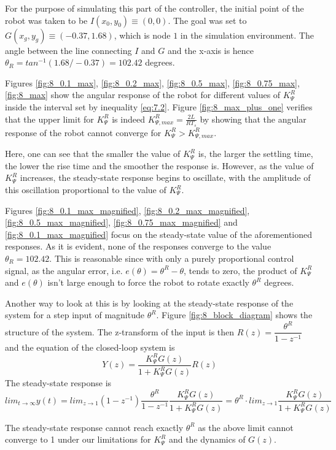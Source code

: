 For the purpose of simulating this part of the controller, the initial point of
the robot was taken to be $I (x_0, y_0) \equiv (0,0)$. The goal was set to
$G (x_g, y_g) \equiv (-0.37, 1.68)$, which is node $1$ in the simulation
environment. The angle between the line connecting $I$ and $G$ and the
x-axis is hence $\theta_R = tan^{-1}(1.68 / -0.37) = 102.42$ degrees.

Figures \ref{fig:8_0.1_max}, \ref{fig:8_0.2_max}, \ref{fig:8_0.5_max},
\ref{fig:8_0.75_max}, \ref{fig:8_max} show the angular response of the robot
for different values of $K_{\Psi}^R$ inside the interval set by inequality
\ref{eq:7.2}. Figure \ref{fig:8_max_plus_one} verifies that the upper limit
for $K_{\Psi}^R$ is indeed $K_{\Psi,max}^R = \frac{2L}{RT_s}$ by showing that the
angular response of the robot cannot converge for $K_{\Psi}^R > K_{\Psi,max}^R$.

Here, one can see that the smaller the value of $K_{\Psi}^R$ is, the larger the
settling time, the lower the rise time and the smoother the response is. However,
as the value of $K_{\Psi}^R$ increases, the steady-state response begins to
oscillate, with the amplitude of this oscillation proportional to the value of
$K_{\Psi}^R$.

Figures \ref{fig:8_0.1_max_magnified}, \ref{fig:8_0.2_max_magnified},
\ref{fig:8_0.5_max_magnified}, \ref{fig:8_0.75_max_magnified} and
\ref{fig:8_0.1_max_magnified} focus on the steady-state value of the
aforementioned responses. As it is evident, none of the responses converge to
the value $\theta_R = 102.42$. This is reasonable since with only a purely
proportional control signal, as the angular error, i.e. $e(\theta) = \theta^R - \theta$,
tends to zero, the product of $K_{\Psi}^R$ and $e(\theta)$ isn't large enough
to force the robot to rotate exactly $\theta^R$ degrees.

Another way to look at this is by looking at the steady-state response of the
system for a step input of magnitude $\theta^R$. Figure \ref{fig:8_block_diagram}
shows the structure of the system. The z-transform of the input
is then $R(z) = \dfrac{\theta^R}{1 - z^{-1}}$ and the equation of the closed-loop
system is
$$Y(z) = \dfrac{K_{\Psi}^R G(z)}{1 + K_{\Psi}^R G(z)} R(z)$$
The steady-state response is
$$lim_{t \to \infty} y(t) = lim_{z \to 1} (1-z^{-1}) \dfrac{\theta^R}{1-z^{-1}}
\dfrac{K_{\Psi}^R G(z)}{1 + K_{\Psi}^R G(z)} = \theta^R \cdot lim_{z \to 1}
\dfrac{K_{\Psi}^R G(z)}{1 + K_{\Psi}^R G(z)}$$

The steady-state response cannot reach exactly $\theta^R$ as the above limit
cannot converge to 1 under our limitations for $K_{\Psi}^R$ and the dynamics of
$G(z)$.

